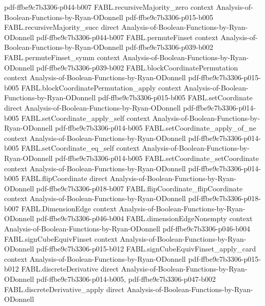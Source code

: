 \begin{theorem}
  {pdf-ffbe9c7b3306-p044-b007}
\proofstep
  {FABL.recursiveMajority_zero}
  {context}
  {Analysis-of-Boolean-Functions-by-Ryan-ODonnell}
  {pdf-ffbe9c7b3306-p015-b005}
\proofstep
  {FABL.recursiveMajority_succ}
  {direct}
  {Analysis-of-Boolean-Functions-by-Ryan-ODonnell}
  {pdf-ffbe9c7b3306-p044-b007}
\proofstep
  {FABL.permuteFinset}
  {context}
  {Analysis-of-Boolean-Functions-by-Ryan-ODonnell}
  {pdf-ffbe9c7b3306-p039-b002}
\proofstep
  {FABL.permuteFinset_symm}
  {context}
  {Analysis-of-Boolean-Functions-by-Ryan-ODonnell}
  {pdf-ffbe9c7b3306-p039-b002}
\proofstep
  {FABL.blockCoordinatePermutation}
  {context}
  {Analysis-of-Boolean-Functions-by-Ryan-ODonnell}
  {pdf-ffbe9c7b3306-p015-b005}
\proofstep
  {FABL.blockCoordinatePermutation_apply}
  {context}
  {Analysis-of-Boolean-Functions-by-Ryan-ODonnell}
  {pdf-ffbe9c7b3306-p015-b005}
\proofstep
  {FABL.setCoordinate}
  {direct}
  {Analysis-of-Boolean-Functions-by-Ryan-ODonnell}
  {pdf-ffbe9c7b3306-p014-b005}
\proofstep
  {FABL.setCoordinate_apply_self}
  {context}
  {Analysis-of-Boolean-Functions-by-Ryan-ODonnell}
  {pdf-ffbe9c7b3306-p014-b005}
\proofstep
  {FABL.setCoordinate_apply_of_ne}
  {context}
  {Analysis-of-Boolean-Functions-by-Ryan-ODonnell}
  {pdf-ffbe9c7b3306-p014-b005}
\proofstep
  {FABL.setCoordinate_eq_self}
  {context}
  {Analysis-of-Boolean-Functions-by-Ryan-ODonnell}
  {pdf-ffbe9c7b3306-p014-b005}
\proofstep
  {FABL.setCoordinate_setCoordinate}
  {context}
  {Analysis-of-Boolean-Functions-by-Ryan-ODonnell}
  {pdf-ffbe9c7b3306-p014-b005}
\proofstep
  {FABL.flipCoordinate}
  {direct}
  {Analysis-of-Boolean-Functions-by-Ryan-ODonnell}
  {pdf-ffbe9c7b3306-p018-b007}
\proofstep
  {FABL.flipCoordinate_flipCoordinate}
  {context}
  {Analysis-of-Boolean-Functions-by-Ryan-ODonnell}
  {pdf-ffbe9c7b3306-p018-b007}
\proofstep
  {FABL.DimensionEdge}
  {context}
  {Analysis-of-Boolean-Functions-by-Ryan-ODonnell}
  {pdf-ffbe9c7b3306-p046-b004}
\proofstep
  {FABL.dimensionEdgeNonempty}
  {context}
  {Analysis-of-Boolean-Functions-by-Ryan-ODonnell}
  {pdf-ffbe9c7b3306-p046-b004}
\proofstep
  {FABL.signCubeEquivFinset}
  {context}
  {Analysis-of-Boolean-Functions-by-Ryan-ODonnell}
  {pdf-ffbe9c7b3306-p015-b012}
\proofstep
  {FABL.signCubeEquivFinset_apply_card}
  {context}
  {Analysis-of-Boolean-Functions-by-Ryan-ODonnell}
  {pdf-ffbe9c7b3306-p015-b012}
\proofstep
  {FABL.discreteDerivative}
  {direct}
  {Analysis-of-Boolean-Functions-by-Ryan-ODonnell}
  {pdf-ffbe9c7b3306-p014-b005,
    pdf-ffbe9c7b3306-p047-b002}
\proofstep
  {FABL.discreteDerivative_apply}
  {direct}
  {Analysis-of-Boolean-Functions-by-Ryan-ODonnell}

\end{theorem}
